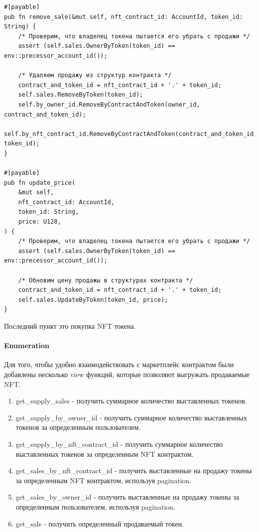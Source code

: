 \begin{verbatim}
#[payable]
pub fn remove_sale(&mut self, nft_contract_id: AccountId, token_id: String) {
    /* Проверим, что владелец токена пытается его убрать с продажи */
    assert (self.sales.OwnerByToken(token_id) == env::precessor_account_id());

    /* Удаляем продажу из структур контракта */
    contract_and_token_id = nft_contract_id + '.' + token_id;
    self.sales.RemoveByToken(token_id);
    self.by_owner_id.RemoveByContractAndToken(owner_id, contract_and_token_id);
    self.by_nft_contract_id.RemoveByContractAndToken(contract_and_token_id, token_id);
}

#[payable]
pub fn update_price(
    &mut self,
    nft_contract_id: AccountId,
    token_id: String,
    price: U128,
) {
    /* Проверим, что владелец токена пытается его убрать с продажи */
    assert (self.sales.OwnerByToken(token_id) == env::precessor_account_id());

    /* Обновим цену продажы в структурах контракта */
    contract_and_token_id = nft_contract_id + '.' + token_id;
    self.sales.UpdateByToken(token_id, price);
}
\end{verbatim}

Последний пункт это покупка NFT токена.

\paragraph{Enumeration}

Для того, чтобы удобно взаимодействовать с маркетплейс контрактом были добавлены несколько view функций, которые позволяют выгружать продаваемые NFT.
\begin{enumerate}
\item get\_supply\_sales - получить суммарное количество выставленных токенов.
\item get\_supply\_by\_owner\_id - получить суммарное количество выставленных токенов за определенным пользователем.
\item get\_supply\_by\_nft\_contract\_id - получить суммарное количество выставленных токенов за определенным NFT контрактом.
\item get\_sales\_by\_nft\_contract\_id - получить выставленные на продажу токены за определенным NFT контрактом, используя pagination.
\item get\_sales\_by\_owner\_id - получить выставленные на продажу токены за определенным пользователем, используя pagination.
\item get\_sale - получить определенный продаваемый токен.
\end{enumerate}

